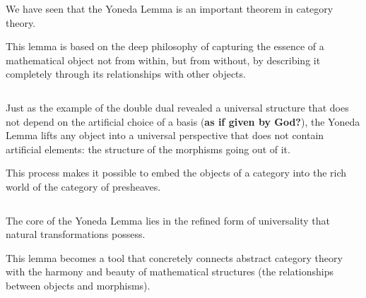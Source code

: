 \documentclass[uplatex,a4j,12pt,dvipdfmx]{jsarticle}
\begin{document}
We have seen that the Yoneda Lemma is an important theorem in category theory.

This lemma is based on the deep philosophy of capturing the essence of a mathematical object not from within, but from without, by describing it completely through its relationships with other objects.

	${}$

Just as the example of the double dual revealed a universal structure that does not depend on the artificial choice of a basis (\textbf{as if given by God?}),
the Yoneda Lemma lifts any object into a universal perspective that does not contain artificial elements: the structure of the morphisms going out of it.


This process makes it possible to embed the objects of a category into the rich world of the category of presheaves.

	${}$

The core of the Yoneda Lemma lies in the refined form of universality that natural transformations possess.

This lemma becomes a tool that concretely connects abstract category theory with the harmony and beauty of mathematical structures (the relationships between objects and morphisms).
\end{document}
